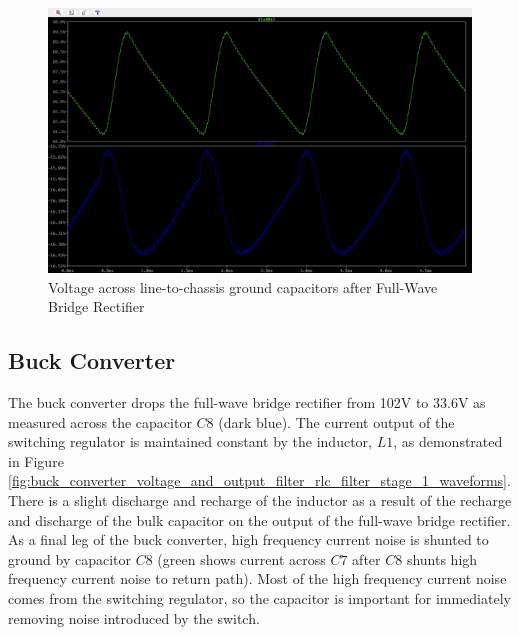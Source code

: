 \documentclass[conference]{IEEEtran}
\begin{document}
\begin{figure}[htp]
    \centering
    \includegraphics[width=1.0\linewidth]{full_wave_bridge_rectifier_chassis_caps_waveform.png}
    \caption{Voltage across line-to-chassis ground capacitors after Full-Wave Bridge Rectifier}
    \label{fig:full_wave_bridge_rectifier_chassis_caps_waveform}
\end{figure}

\subsection{Buck Converter}

The buck converter drops the full-wave bridge rectifier from 102V to 33.6V as measured across the capacitor $C8$ (dark blue). The current output of the switching regulator is maintained constant by the inductor, $L1$, as demonstrated in Figure \ref{fig:buck_converter_voltage_and_output_filter_rlc_filter_stage_1_waveforms}. There is a slight discharge and recharge of the inductor as a result of the recharge and discharge of the bulk capacitor on the output of the full-wave bridge rectifier. As a final leg of the buck converter, high frequency current noise is shunted to ground by capacitor $C8$ (green shows current across $C7$ after $C8$ shunts high frequency current noise to return path). Most of the high frequency current noise comes from the switching regulator, so the capacitor is important for immediately removing noise introduced by the switch.
\end{document}
